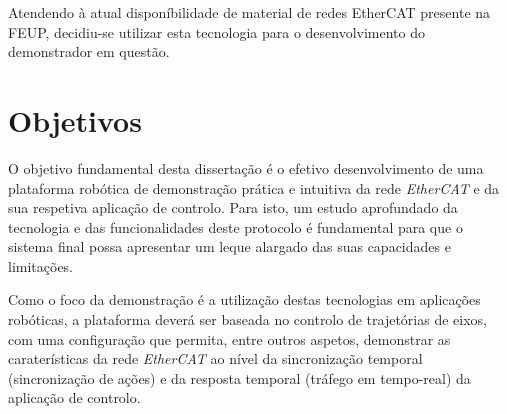 Atendendo à atual disponíbilidade de material de redes EtherCAT presente na FEUP, decidiu-se utilizar esta tecnologia para o desenvolvimento do demonstrador em questão. 


\section{Objetivos}\label{sec:objetivos}

O objetivo fundamental desta dissertação é o efetivo desenvolvimento de uma plataforma robótica de demonstração prática e intuitiva da rede \textit{EtherCAT} e da sua
respetiva aplicação de controlo.
Para isto, um estudo aprofundado da tecnologia e das funcionalidades deste protocolo é fundamental para que o sistema final possa apresentar um leque alargado
das suas capacidades e limitações.

Como o foco da demonstração é a utilização destas tecnologias em aplicações robóticas, a plataforma deverá ser baseada no controlo de trajetórias de eixos, com uma
configuração que permita, entre outros aspetos, demonstrar as caraterísticas da rede \textit{EtherCAT} ao nível da sincronização temporal (sincronização de ações) e da resposta
temporal (tráfego em tempo-real) da aplicação de controlo.
